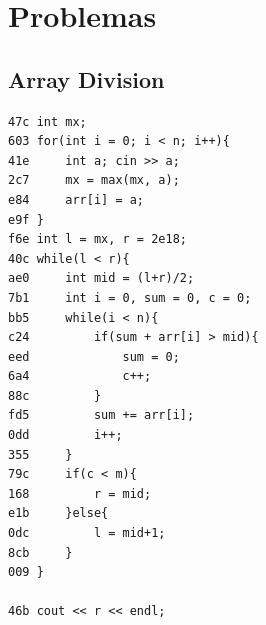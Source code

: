 \documentclass[11pt, a4paper, twoside]{article}
\begin{document}
%
%

\section{Problemas}

\subsection{Array Division}
\begin{lstlisting}
47c int mx;
603 for(int i = 0; i < n; i++){
41e     int a; cin >> a;
2c7     mx = max(mx, a);
e84     arr[i] = a;
e9f }
f6e int l = mx, r = 2e18;
40c while(l < r){
ae0     int mid = (l+r)/2;
7b1     int i = 0, sum = 0, c = 0;
bb5     while(i < n){
c24         if(sum + arr[i] > mid){
eed             sum = 0; 
6a4             c++;
88c         }
fd5         sum += arr[i];
0dd         i++;
355     }
79c     if(c < m){
168         r = mid;
e1b     }else{
0dc         l = mid+1;
8cb     }
009 }

46b cout << r << endl;
\end{lstlisting}
\end{document}
